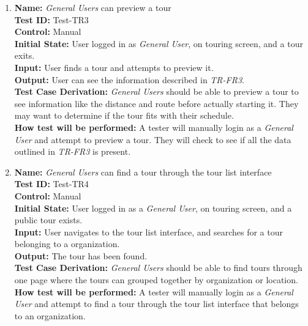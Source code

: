 \documentclass[12pt, titlepage]{article}
\begin{document}
\begin{enumerate}
    \item
    \textbf{Name:} \textit{General Users} can preview a tour \label{itm:Test-TR3} \\
    \textbf{Test ID:} Test-TR3 \\
    \textbf{Control:} Manual \\
    \textbf{Initial State:} User logged in as \textit{General User}, on touring screen, and a tour exits. \\
    \textbf{Input:} User finds a tour and attempts to preview it. \\
    \textbf{Output:} User can see the information described in \textit{TR-FR3}. \\
    \textbf{Test Case Derivation:} \textit{General Users} should be able to preview a tour to see information like the distance and route before actually starting it. They may want to determine if the tour fits with their schedule. \\
    \textbf{How test will be performed:} A tester will manually login as a \textit{General User} and attempt to preview a tour. They will check to see if all the data outlined in \textit{TR-FR3} is present.

    \item
    \textbf{Name:} \textit{General Users} can find a tour through the tour list interface \label{itm:Test-TR4} \\
    \textbf{Test ID:} Test-TR4 \\
    \textbf{Control:} Manual \\
    \textbf{Initial State:} User logged in as a \textit{General User}, on touring screen, and a public tour exists. \\
    \textbf{Input:} User navigates to the tour list interface, and searches for a tour belonging to a organization. \\
    \textbf{Output:} The tour has been found. \\
    \textbf{Test Case Derivation:} \textit{General Users} should be able to find tours through one page where the tours can grouped together by organization or location. \\
    \textbf{How test will be performed:} A tester will manually login as a \textit{General User} and attempt to find a tour through the tour list interface that belongs to an organization.


\end{enumerate}
\end{document}
